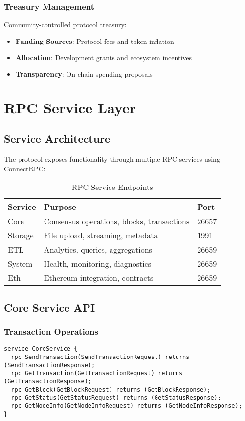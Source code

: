 \documentclass[11pt,a4paper]{article}
\begin{document}
\subsubsection{Treasury Management}
Community-controlled protocol treasury:

\begin{itemize}
  \item \textbf{Funding Sources}: Protocol fees and token inflation
  \item \textbf{Allocation}: Development grants and ecosystem incentives
  \item \textbf{Transparency}: On-chain spending proposals
\end{itemize}

\section{RPC Service Layer}

\subsection{Service Architecture}

The protocol exposes functionality through multiple RPC services using ConnectRPC:

\begin{table}[H]
  \centering
  \begin{tabular}{|l|l|l|}
    \hline
    \textbf{Service} & \textbf{Purpose} & \textbf{Port} \\
    \hline
    Core & Consensus operations, blocks, transactions & 26657 \\
    Storage & File upload, streaming, metadata & 1991 \\
    ETL & Analytics, queries, aggregations & 26659 \\
    System & Health, monitoring, diagnostics & 26659 \\
    Eth & Ethereum integration, contracts & 26659 \\
    \hline
  \end{tabular}
  \caption{RPC Service Endpoints}
\end{table}

\subsection{Core Service API}

\subsubsection{Transaction Operations}
\begin{lstlisting}[caption=Core Service Methods]
service CoreService {
  rpc SendTransaction(SendTransactionRequest) returns (SendTransactionResponse);
  rpc GetTransaction(GetTransactionRequest) returns (GetTransactionResponse);
  rpc GetBlock(GetBlockRequest) returns (GetBlockResponse);
  rpc GetStatus(GetStatusRequest) returns (GetStatusResponse);
  rpc GetNodeInfo(GetNodeInfoRequest) returns (GetNodeInfoResponse);
}
\end{lstlisting}
\end{document}
